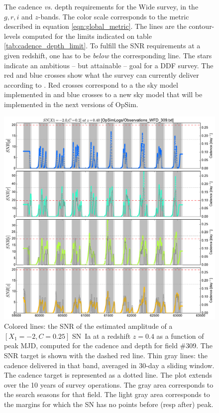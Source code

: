 \documentclass[\docopts]{\docclass}
\begin{document}
\begin{figure}[t]
\begin{center}
\caption{The cadence {\em vs.} depth requirements for the Wide survey,
  in the $g, r, i$ and $z$-bands. The color scale corresponds to the
  metric described in equation \ref{eqn:global_metric}.  The lines are
  the contour-levels computed for the limits indicated on table
  \ref{tab:cadence_depth_limit}. To fulfill the SNR requirements at a
  given redshift, one has to be {\em below} the corresponding
  line. The stars indicate an ambitious -- but attainable -- goal for
  a DDF survey.  The red and blue crosses show what the survey can currently
  deliver according to . Red crosses correspond to
  a the sky model implemented in  and blue crosses to a
  new sky model that will be implemented in the next versions of OpSim.}
\label{fig:m5_cadence_limits_wide}
\end{center}
\end{figure}

\begin{figure}[t]
  \begin{center}
    \includegraphics[width=\linewidth]{metric_WFD_309.pdf}
    \caption{Colored lines: the SNR of the estimated amplitude of a
      $[X_1=-2, C=0.25]$ SN~Ia at a redshift $z = 0.4$ as a function of
      peak MJD, computed for the  cadence and depth
      for field \#309. The SNR target is shown with the dashed red
      line.  Thin gray lines: the cadence delivered in that band,
      averaged in 30-day a sliding window.  The cadence target is
      represented as a dotted line. The plot extends over the 10 years
      of survey operations. The gray area corresponds to the search
      seasons for that field. The light gray area corresponds to the
      margins for which the SN has no points before (resp after)
      peak.}
    \label{fig:snr_metric_wide}
  \end{center}
\end{figure}
\end{document}
